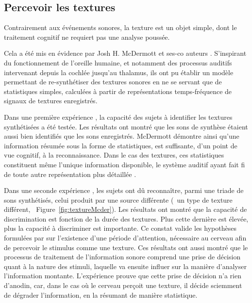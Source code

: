 \subsection{Percevoir les textures}
\label{sec:ch3_texturePerception}

Contrairement aux événements sonores, la texture est un objet simple, dont le traitement cognitif ne requiert pas une analyse poussée. 

Cela a été mis en évidence par Josh H. McDermott et ses-co auteurs \citep{mcdermott2011sound,mcdermott2013summary}. S'inspirant du fonctionnement de l'oreille humaine, et notamment des processus auditifs intervenant depuis la cochlée jusqu'au thalamus, ils ont pu établir un modèle permettant de re-synthétiser des textures sonores en ne se servant que de statistiques simples, calculées à partir de représentations temps-fréquence de signaux de textures enregistrés. 

Dans une première expérience \citep{mcdermott2011sound}, la capacité des sujets à identifier les textures synthétisées a été testée. Les résultats ont montré que les sons de synthèse étaient aussi bien identifiés que les sons enregistrés. McDermott démontre ainsi qu'une information résumée sous la forme de statistiques, est suffisante, d'un point de vue cognitif, à la reconnaissance. Dans le cas des textures, ces statistiques constituent même l'unique information disponible, le système auditif ayant fait fi de toute autre représentation plus détaillée \citep{nelken2013ear}.

Dans une seconde expérience \citep{mcdermott2013summary}, les sujets ont dû reconnaître, parmi une triade de sons synthétisés, celui produit par une source différente (\ie~un type de texture différent, \cf~Figure~\ref{fig:textureMcder}). Les résultats ont montré que la capacité de discrimination est fonction de la durée des textures. Plus cette dernière est élevée, plus la capacité à discriminer est importante. Ce constat valide les hypothèses formulées par \citep{saint1995classification} sur l'existence d'une période d'attention, nécessaire au cerveau afin de percevoir le stimulus comme une texture. Ces résultats ont aussi montré que le processus de traitement de l'information sonore comprend une prise de décision quant à la nature des stimuli, laquelle va ensuite influer sur la manière d'analyser l'information montante. L'expérience prouve que cette prise de décision n'a rien d'anodin, car, dans le cas où le cerveau perçoit une texture, il décide sciemment de dégrader l'information, en la résumant de manière statistique.

